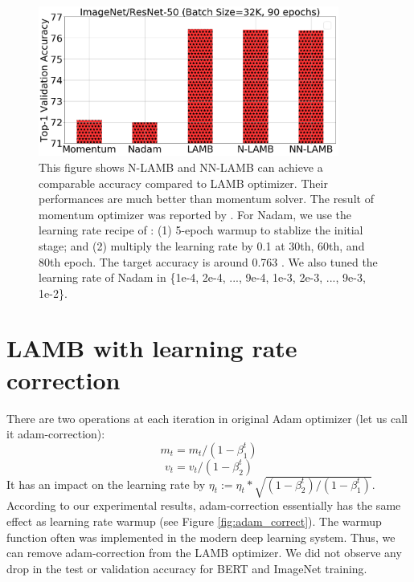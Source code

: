 \begin{figure}[tb]
\vspace{5pt}
\centering
\includegraphics[width=0.88\textwidth]{figs/n_lamb.png}
\caption{This figure shows N-LAMB and NN-LAMB can achieve a comparable accuracy compared to LAMB optimizer. Their performances are much better than momentum solver. The result of momentum optimizer was reported by \cite{goyal2017accurate}. For Nadam, we use the learning rate recipe of \citep{goyal2017accurate}: (1) 5-epoch warmup to stablize the initial stage; and (2) multiply the learning rate by 0.1 at 30th, 60th, and 80th epoch. The target accuracy is around 0.763 \citep{goyal2017accurate}. We also tuned the learning rate of Nadam in \{1e-4, 2e-4, ..., 9e-4, 1e-3, 2e-3, ..., 9e-3, 1e-2\}.}
\label{fig:n_lamb}
\vspace{-10pt}
\end{figure}

\section{LAMB with learning rate correction}

There are two operations at each iteration in original Adam optimizer (let us call it adam-correction):
$$m_t = m_t/(1 - {\beta}_1^t)$$
$$v_t = v_t/(1 - {\beta}_2^t)$$
It has an impact on the learning rate by ${\eta}_t := {\eta}_t * \sqrt{(1 - {\beta}_2^t) / (1 - {\beta}_1^t)}$.
According to our experimental results, adam-correction essentially has the same effect as learning rate warmup (see Figure \ref{fig:adam_correct}). The warmup function often was implemented in the modern deep learning system. Thus, we can remove adam-correction from the LAMB optimizer. We did not observe any drop in the test or validation accuracy for BERT and ImageNet training.

